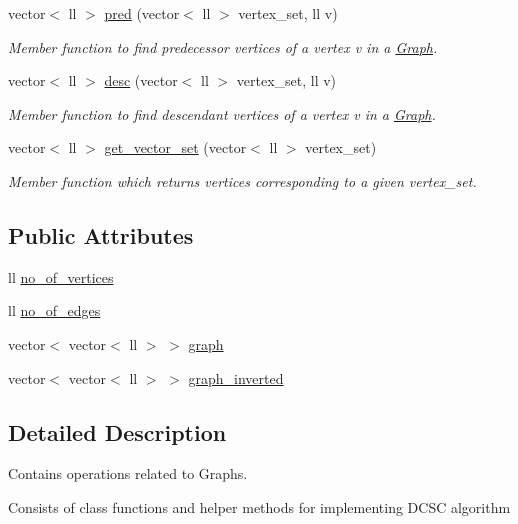 \begin{DoxyCompactItemize}
vector$<$ ll $>$ \hyperlink{classGraph_aa9bb861babacf50c211afc72b5f424fb}{pred} (vector$<$ ll $>$ vertex\+\_\+set, ll v)
\begin{DoxyCompactList}\small\item\em Member function to find predecessor vertices of a vertex v in a \hyperlink{classGraph}{Graph}. \end{DoxyCompactList}\item 
vector$<$ ll $>$ \hyperlink{classGraph_a322040982fd02ab16e2a70b0f9c6758a}{desc} (vector$<$ ll $>$ vertex\+\_\+set, ll v)
\begin{DoxyCompactList}\small\item\em Member function to find descendant vertices of a vertex v in a \hyperlink{classGraph}{Graph}. \end{DoxyCompactList}\item 
vector$<$ ll $>$ \hyperlink{classGraph_ab374b601113c5afe1d6d81c72ccb1fa4}{get\+\_\+vector\+\_\+set} (vector$<$ ll $>$ vertex\+\_\+set)
\begin{DoxyCompactList}\small\item\em Member function which returns vertices corresponding to a given vertex\+\_\+set. \end{DoxyCompactList}\end{DoxyCompactItemize}
\subsection*{Public Attributes}
\begin{DoxyCompactItemize}
\item 
ll \hyperlink{classGraph_a9b23a1ce91eceed3856b453858e61a05}{no\+\_\+of\+\_\+vertices}
\item 
ll \hyperlink{classGraph_a49735f451a8a2cd7ae8334df2adb42cf}{no\+\_\+of\+\_\+edges}
\item 
vector$<$ vector$<$ ll $>$ $>$ \hyperlink{classGraph_ab8435b2eb808e20c78688da1818a3a8a}{graph}
\item 
vector$<$ vector$<$ ll $>$ $>$ \hyperlink{classGraph_ab0d5142a7def6b33069b6dbaba9fdf1c}{graph\+\_\+inverted}
\end{DoxyCompactItemize}


\subsection{Detailed Description}
Contains operations related to Graphs. 

Consists of class functions and helper methods for implementing D\+C\+SC algorithm 

